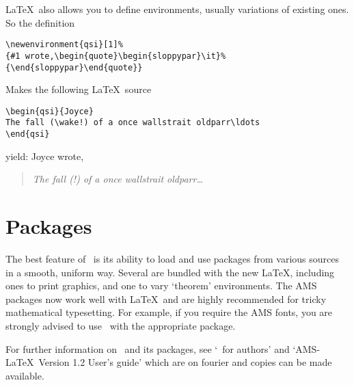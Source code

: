 \documentclass[11pt,a4paper]{article}
\begin{document}
\newenvironment{qsi}[1]%
{#1 wrote,\begin{quote}\begin{sloppypar}\it}%
{\end{sloppypar}\end{quote}}
\LaTeX\ also allows you to define environments, usually
variations of existing ones.  So the definition
\begin{verbatim}
\newenvironment{qsi}[1]%
{#1 wrote,\begin{quote}\begin{sloppypar}\it}%
{\end{sloppypar}\end{quote}}
\end{verbatim}
Makes the following \LaTeX\ source
\begin{verbatim}
\begin{qsi}{Joyce}
The fall (\wake!) of a once wallstrait oldparr\ldots
\end{qsi}
\end{verbatim}
yield: \begin{qsi}{Joyce}
The fall (\wake!) of a once wallstrait oldparr\ldots
\end{qsi}

\section{Packages}  

The best feature of \LaTeXe\ is its ability to load
and use packages from various sources in a smooth, uniform way.  
Several are bundled with the
new \LaTeX, including ones to print graphics, and one to vary 
`theorem' environments. 
The AMS packages now work well with \LaTeX\ and are highly recommended
for tricky mathematical typesetting.  For example, if you require
the AMS fonts, you are strongly advised to use \LaTeXe\ with the
appropriate package.

For further information on \LaTeXe\ and its packages, see
`\LaTeXe\ for authors' and `AMS-\LaTeX\ Version 1.2 User's guide'
which are on fourier and copies can be made available.
\end{document}
